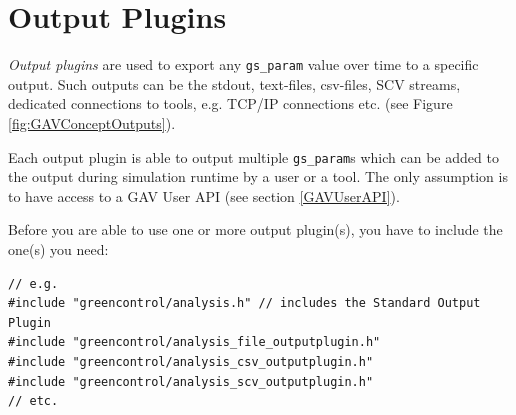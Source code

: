 
\section{Output Plugins}
\label{GAVOutputPlugins}

{\em Output plugins} are used to export any \lstinline|gs_param| value over time to a specific output. Such outputs can be the stdout, text-files, csv-files, SCV streams, dedicated connections to tools, e.g. TCP/IP connections etc. (see Figure \ref{fig:GAVConceptOutputs}).

Each output plugin is able to output multiple \lstinline|gs_param|s which can be added to the output during simulation runtime by a user or a tool. The only assumption is to have access to a GAV User API (see section \ref{GAVUserAPI}).

Before you are able to use one or more output plugin(s), you have to include the one(s) you need:

\noindent
\begin{minipage}{\textwidth}
\begin{lstlisting}[caption={Include for output plugin}, label=lst:GAVIncludeOutputPlugin]
// e.g.
#include "greencontrol/analysis.h" // includes the Standard Output Plugin
#include "greencontrol/analysis_file_outputplugin.h"
#include "greencontrol/analysis_csv_outputplugin.h"
#include "greencontrol/analysis_scv_outputplugin.h"
// etc.
\end{lstlisting}
\end{minipage}

